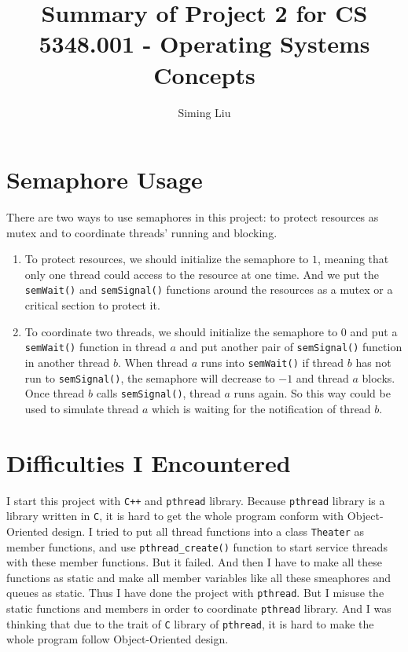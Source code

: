 \documentclass[a4paper]{report}
\begin{document}
\title{Summary of Project 2 for CS 5348.001 - Operating Systems Concepts}

\author{Siming Liu}

\maketitle{}

\section*{Semaphore Usage}
There are two ways to use semaphores in this project: to protect resources as mutex and to coordinate threads' running and blocking.
\begin{enumerate}[label=\textbf{\textit{\alph*}})]
  \item To protect resources, we should initialize the semaphore to $1$, meaning that only one thread could access to the resource at one time. And we put the \lstinline{semWait()} and \lstinline{semSignal()} functions around the resources as a mutex or a critical section to protect it.
  \item To coordinate two threads, we should initialize the semaphore to $0$ and put a \lstinline{semWait()} function in thread $a$ and put another pair of \lstinline{semSignal()} function in another thread $b$. When thread $a$ runs into \lstinline{semWait()} if thread $b$ has not run to \lstinline{semSignal()}, the semaphore will decrease to $-1$ and thread $a$ blocks. Once thread $b$ calls \lstinline{semSignal()}, thread $a$ runs again. So this way could be used to simulate thread $a$ which is waiting for the notification of thread $b$.
\end{enumerate}

\section*{Difficulties I Encountered}
I start this project with \lstinline{C++} and \lstinline{pthread} library. Because \lstinline{pthread} library is a library written in \lstinline{C}, it is hard to get the whole program conform with Object-Oriented design. I tried to put all thread functions into a class \lstinline{Theater} as member functions, and use \lstinline{pthread_create()} function to start service threads with these member functions. But it failed. And then I have to make all these functions as static and make all member variables like all these smeaphores and queues as static. Thus I have done the project with \lstinline{pthread}. But I misuse the static functions and members in order to coordinate \lstinline{pthread} library. And I was thinking that due to the trait of \lstinline{C} library of \lstinline{pthread}, it is hard to make the whole program follow Object-Oriented design.
\end{document}
